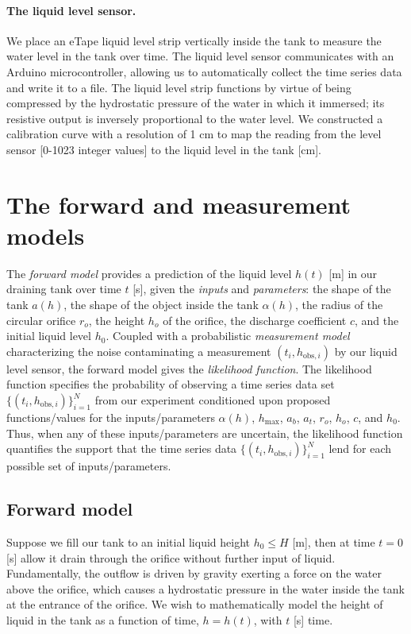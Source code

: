 \documentclass[openacc]{rsproca_new}%
\newcommand\thedata {$\{(t_i,h_{\text{obs}, i})\}_{i=1}^{N}$\xspace}
\begin{document}
\paragraph{The liquid level sensor.} We place an eTape\texttrademark\xspace liquid level strip vertically inside the tank to measure the water level in the tank over time. The liquid level sensor communicates with an Arduino microcontroller, allowing us to automatically collect the time series data and write it to a file. The liquid level strip functions by virtue of being compressed by the hydrostatic pressure of the water in which it immersed; its resistive output is inversely proportional to the water level. 
\cite{eTape}
We constructed a calibration curve with a resolution of 1 cm to map the reading from the level sensor [0-1023 integer values] to the liquid level in the tank [cm]. 

\section{The forward and measurement models} \label{sec:forward_model}
The \emph{forward model} provides a prediction of the liquid level $h(t)$ [m] in our draining tank over time $t$ [s], given the \emph{inputs} and \emph{parameters}: the shape of the tank $a(h)$, the shape of the object inside the tank $\alpha(h)$, the radius of the circular orifice $r_o$, the height $h_o$ of the orifice, the discharge coefficient $c$, and the initial liquid level $h_0$. 
Coupled with a probabilistic \emph{measurement model} characterizing the noise contaminating a measurement $(t_i, h_{\text{obs}, i})$ by our liquid level sensor, the forward model gives the \emph{likelihood function}. The likelihood function specifies the probability of observing a time series data set \thedata from our experiment conditioned upon proposed functions/values for the inputs/parameters $\alpha(h)$, $h_{\text{max}}$, $a_b$, $a_t$, $r_o$, $h_o$, $c$, and $h_0$. Thus, when any of these inputs/parameters are uncertain, the likelihood function quantifies the support that the time series data \thedata lend for each possible set of inputs/parameters.

\subsection{Forward model}
Suppose we fill our tank to an initial liquid height $h_0 \leq H$ [m], then at time $t=0$ [s] allow it drain through the orifice without further input of liquid. Fundamentally, the outflow is driven by gravity exerting a force on the water above the orifice, which causes a hydrostatic pressure in the water inside the tank at the entrance of the orifice. 
We wish to mathematically model the height of liquid in the tank as a function of time, $h=h(t)$, with $t$ [s] time. 
\end{document}

